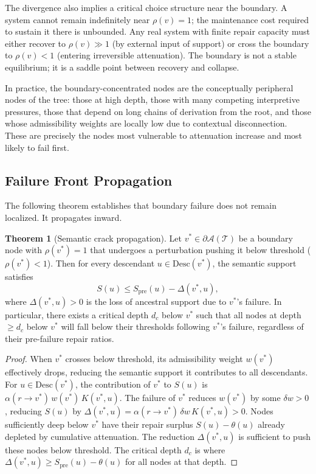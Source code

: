 \documentclass[11pt, a4paper]{article}
\theoremstyle{definition}
\newtheorem{theorem}{Theorem}
\theoremstyle{remark}
\begin{document}
The divergence also implies a critical choice structure near the boundary. A
system cannot remain indefinitely near $\rho(v) = 1$; the maintenance cost
required to sustain it there is unbounded. Any real system with finite repair
capacity must either recover to $\rho(v) \gg 1$ (by external input of support)
or cross the boundary to $\rho(v) < 1$ (entering irreversible attenuation).
The boundary is not a stable equilibrium; it is a saddle point between recovery
and collapse.

In practice, the boundary-concentrated nodes are the conceptually peripheral
nodes of the tree: those at high depth, those with many competing interpretive
pressures, those that depend on long chains of derivation from the root, and
those whose admissibility weights are locally low due to contextual
disconnection. These are precisely the nodes most vulnerable to attenuation
increase and most likely to fail first.

\subsection{Failure Front Propagation}

The following theorem establishes that boundary failure does not remain
localized. It propagates inward.

\begin{theorem}[Semantic crack propagation]
Let $v^* \in \partial\mathcal{A}(\mathcal{T})$ be a boundary node with
$\rho(v^*) = 1$ that undergoes a perturbation pushing it below threshold
($\rho(v^*) < 1$). Then for every descendant $u \in \mathrm{Desc}(v^*)$,
the semantic support satisfies
\[
S(u) \leq S_{\mathrm{pre}}(u) - \Delta(v^*, u),
\]
where $\Delta(v^*, u) > 0$ is the loss of ancestral support due to
$v^*$'s failure. In particular, there exists a critical depth
$d_c$ below $v^*$ such that all nodes at depth $\geq d_c$ below $v^*$
will fall below their thresholds following $v^*$'s failure, regardless of
their pre-failure repair ratios.
\end{theorem}

\begin{proof}
When $v^*$ crosses below threshold, its admissibility weight $w(v^*)$
effectively drops, reducing the semantic support it contributes to all
descendants. For $u \in \mathrm{Desc}(v^*)$, the contribution of $v^*$
to $S(u)$ is $\alpha(r \to v^*)\, w(v^*)\, K(v^*, u)$. The failure of $v^*$
reduces $w(v^*)$ by some $\delta w > 0$, reducing $S(u)$ by
$\Delta(v^*, u) = \alpha(r \to v^*)\, \delta w\, K(v^*, u) > 0$.
Nodes sufficiently deep below $v^*$ have their repair surplus
$S(u) - \theta(u)$ already depleted by cumulative attenuation. The reduction
$\Delta(v^*, u)$ is sufficient to push these nodes below threshold. The
critical depth $d_c$ is where $\Delta(v^*, u) \geq S_{\mathrm{pre}}(u) - \theta(u)$
for all nodes at that depth.
\end{proof}
\end{document}
